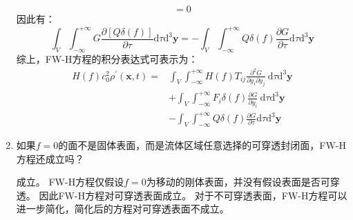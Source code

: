 \begin{enumerate}
\begin{equation}
            = 0
        \end{equation}
        因此有：
        \begin{equation}
            \int_{V} \int_{-\infty}^{+\infty} G \frac{\partial[Q \delta(f)]}{\partial \tau} \mathrm{d} \tau \mathrm{d}^{3} \mathbf{y}
            =-\int_{V} \int_{-\infty}^{+\infty} Q \delta(f) \frac{\partial G}{\partial \tau} \mathrm{d} \tau \mathrm{d}^{3} \mathbf{y}
        \end{equation}
        综上，FW-H方程的积分表达式可表示为：
        \begin{equation}
            \begin{aligned}
                H(f) c_{0}^{2} \rho^{\prime}(\mathbf{x}, t)
                =&\int_{V} \int_{-\infty}^{+\infty} H(f) T_{i j} \frac{\partial^{2} G}{\partial y_{i} \partial y_{j}} \mathrm{~d} \tau \mathrm{d}^{3} \mathbf{y} \\
                &+\int_{V} \int_{-\infty}^{+\infty} F_{i} \delta(f) \frac{\partial G}{\partial y_{i}} \mathrm{~d} \tau \mathrm{d}^{3} \mathbf{y} \\
                &-\int_{V} \int_{-\infty}^{+\infty} Q \delta(f) \frac{\partial G}{\partial \tau} \mathrm{d} \tau \mathrm{d}^{3} \mathbf{y}   
            \end{aligned}
        \end{equation}



    \item 如果\(f=0\)的面不是固体表面，而是流体区域任意选择的可穿透封闭面，FW-H方程还成立吗？
    
        成立。
        FW-H方程仅假设\(f=0\)为移动的刚体表面，并没有假设表面是否可穿透。
        因此FW-H方程对可穿透表面成立。
        对于不可穿透表面，FW-H方程可以进一步简化，简化后的方程对可穿透表面不成立。

\end{enumerate}

\clearpage